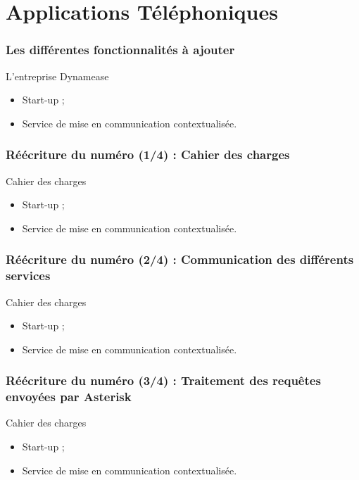 \section{Applications Téléphoniques}
\author{Kévin Moreau}


\begin{frame}
	\frametitle{Les différentes fonctionnalités à ajouter}

	\begin{block}{L'entreprise Dynamease}
	 \begin{itemize}
      \item Start-up ;
	  \item Service de mise en communication contextualisée.
	 \end{itemize}
	\end{block}
\end{frame}

\begin{frame}
	\frametitle{Réécriture du numéro (1/4) : Cahier des charges}

	\begin{block}{Cahier des charges}
	 \begin{itemize}
      \item Start-up ;
	  \item Service de mise en communication contextualisée.
	 \end{itemize}
	\end{block}
\end{frame}

\begin{frame}
	\frametitle{Réécriture du numéro (2/4) : Communication des différents services}

	\begin{block}{Cahier des charges}
	 \begin{itemize}
      \item Start-up ;
	  \item Service de mise en communication contextualisée.
	 \end{itemize}
	\end{block}
\end{frame}

\begin{frame}
	\frametitle{Réécriture du numéro (3/4) : Traitement des requêtes envoyées par Asterisk}

	\begin{block}{Cahier des charges}
	 \begin{itemize}
      \item Start-up ;
	  \item Service de mise en communication contextualisée.
	 \end{itemize}
	\end{block}
\end{frame}

